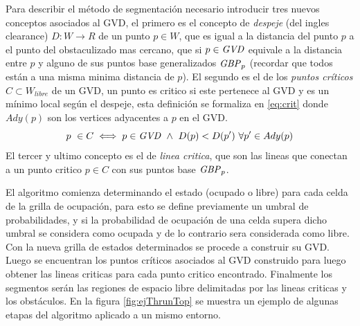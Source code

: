 Para describir el método de segmentación necesario introducir tres nuevos conceptos asociados al GVD, el primero es el concepto de \emph{despeje} (del ingles clearance) $D : W \rightarrow R$ de un punto $p \in W$, que es igual a la distancia del punto $p$ a el punto del obstaculizado mas cercano, que si $p \in \mathit{GVD}$ equivale a la distancia entre $p$ y alguno de sus puntos base generalizados $\mathit{GBP}_p$ (recordar que todos están a una misma minima distancia de $p$). El segundo es el de los \emph{puntos críticos} $C \subset W_{libre}$ de un GVD, un punto es critico si este pertenece al GVD y es un mínimo local según el despeje, esta definición se formaliza en \eqref{eq:crit} donde $Ady(p)$ son los vertices adyacentes a $p$ en el GVD. 
\begin{equation}
  p\ \in C \iff p \in \mli{GVD}\ \land \ D(p) < D(p')\ \forall p' \in Ady(p) \label{eq:crit}
\end{equation}
El tercer y ultimo concepto es el de \emph{linea critica}, que son las lineas que conectan a un punto critico $p \in C$ con sus puntos base $\mathit{GBP}_p$.

El algoritmo comienza determinando el estado (ocupado o libre) para cada celda de la grilla de ocupación, para esto se define previamente un umbral de probabilidades, y si la probabilidad de ocupación de una celda supera dicho umbral se considera como ocupada y de lo contrario sera considerada como libre. Con la nueva grilla de estados determinados se procede a construir su  GVD. Luego se encuentran los puntos críticos asociados al GVD construido para luego obtener las lineas criticas para cada punto critico encontrado. Finalmente los segmentos serán las regiones de espacio libre delimitadas por las lineas criticas y los obstáculos. En la figura \ref{fig:ejThrunTop} se muestra un ejemplo de algunas etapas del algoritmo aplicado a un mismo entorno.

